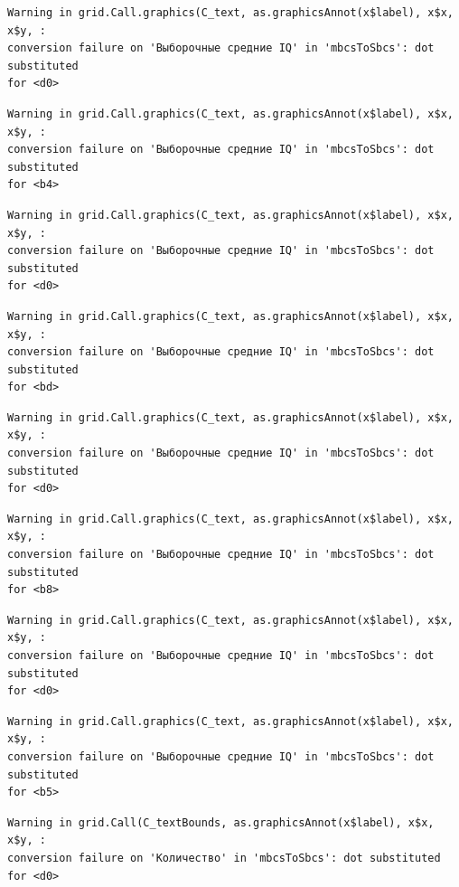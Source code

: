 \documentclass[
  letterpaper,
]{scrbook}
\theoremstyle{definition}
\theoremstyle{remark}
\begin{document}
\begin{verbatim}
Warning in grid.Call.graphics(C_text, as.graphicsAnnot(x$label), x$x, x$y, :
conversion failure on 'Выборочные средние IQ' in 'mbcsToSbcs': dot substituted
for <d0>
\end{verbatim}

\begin{verbatim}
Warning in grid.Call.graphics(C_text, as.graphicsAnnot(x$label), x$x, x$y, :
conversion failure on 'Выборочные средние IQ' in 'mbcsToSbcs': dot substituted
for <b4>
\end{verbatim}

\begin{verbatim}
Warning in grid.Call.graphics(C_text, as.graphicsAnnot(x$label), x$x, x$y, :
conversion failure on 'Выборочные средние IQ' in 'mbcsToSbcs': dot substituted
for <d0>
\end{verbatim}

\begin{verbatim}
Warning in grid.Call.graphics(C_text, as.graphicsAnnot(x$label), x$x, x$y, :
conversion failure on 'Выборочные средние IQ' in 'mbcsToSbcs': dot substituted
for <bd>
\end{verbatim}

\begin{verbatim}
Warning in grid.Call.graphics(C_text, as.graphicsAnnot(x$label), x$x, x$y, :
conversion failure on 'Выборочные средние IQ' in 'mbcsToSbcs': dot substituted
for <d0>
\end{verbatim}

\begin{verbatim}
Warning in grid.Call.graphics(C_text, as.graphicsAnnot(x$label), x$x, x$y, :
conversion failure on 'Выборочные средние IQ' in 'mbcsToSbcs': dot substituted
for <b8>
\end{verbatim}

\begin{verbatim}
Warning in grid.Call.graphics(C_text, as.graphicsAnnot(x$label), x$x, x$y, :
conversion failure on 'Выборочные средние IQ' in 'mbcsToSbcs': dot substituted
for <d0>
\end{verbatim}

\begin{verbatim}
Warning in grid.Call.graphics(C_text, as.graphicsAnnot(x$label), x$x, x$y, :
conversion failure on 'Выборочные средние IQ' in 'mbcsToSbcs': dot substituted
for <b5>
\end{verbatim}

\begin{verbatim}
Warning in grid.Call(C_textBounds, as.graphicsAnnot(x$label), x$x, x$y, :
conversion failure on 'Количество' in 'mbcsToSbcs': dot substituted for <d0>
\end{verbatim}
\end{document}
